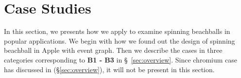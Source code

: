 \section{Case Studies}\label{sec:casestudy}

In this section, we presents how we apply \xxx to examine spinning beachballs
in \nbug popular applications. We begin with how we found out the design of
spinning beachball in Apple with event graph. Then we describe the cases in
three categories corresponding to \textbf{B1 - B3} in \S~\ref{sec:overview}.
Since chromium case has discussed in (\S\ref{sec:overview}), it will not
be present in this section.





%
%
%
%
%
